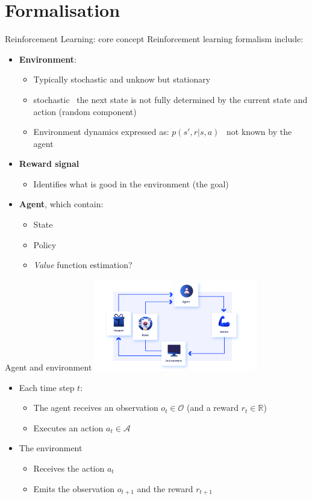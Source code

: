 \documentclass[presentation, 9pt]{beamer}\mode<presentation>{\usetheme{AMSBolognaFC}}
\begin{document}
\section{Formalisation}
\begin{frame}{Reinforcement Learning: core concept}
Reinforcement learning formalism include:
\begin{itemize}
	\item \textbf{Environment}:
	\begin{itemize}
		\item Typically stochastic and unknow but stationary
		\item stochastic \faArrowRight \, the next state is not fully determined by the current state and action (random component)
		\item Environment dynamics expressed as: $p(s', r | s, a)$ \faArrowRight \, not known by the agent
	\end{itemize}
	\item \textbf{Reward signal} 
	\begin{itemize}
		\item Identifies what is good in the environment (the goal)
	\end{itemize}
	\item \textbf{Agent}, which contain:
	\begin{itemize}	
		\item State
		\item Policy
		\item \emph{Value} function estimation?
	\end{itemize}
\end{itemize}
\end{frame}
\begin{frame}{Agent and environment}
\centering
\includegraphics[height=4cm]{img/interaction-loop.png}
\begin{itemize}
	\item Each time step $t$:
	\begin{itemize}
		\item The agent receives an observation $o_t \in \mathcal{O}$ (and a reward $r_t \in \mathbb{R}$)
		\item Executes an action $a_t \in \mathcal{A}$
	\end{itemize}
	\item The environment 
	\begin{itemize}
		\item Receives the action $a_t$
		\item Emits the observation $o_{t+1}$ and the reward $r_{t+1}$
	\end{itemize}
\end{itemize}
\end{frame}
\end{document}
